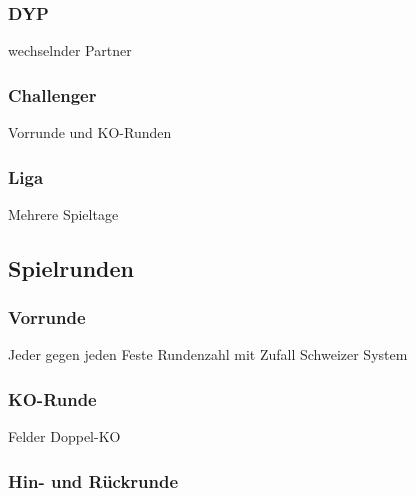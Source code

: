 \subsubsection{DYP}
\label{turniere:vorbereitung:modus:dyp}

wechselnder Partner

\subsubsection{Challenger}
\label{turniere:vorbereitung:modus:challenger}

Vorrunde und KO-Runden


\subsubsection{Liga}
\label{turniere:vorbereitung:modus:liga}

Mehrere Spieltage

\subsection{Spielrunden}
\label{turniere:vorbereitung:spielrunden}

\subsubsection{Vorrunde}
\label{turniere:vorbereitung:spielrunden:vorrunde}

Jeder gegen jeden
Feste Rundenzahl mit Zufall
Schweizer System

\subsubsection{KO-Runde}
\label{turniere:vorbereitung:spielrunden:ko}

Felder
Doppel-KO

\subsubsection{Hin- und Rückrunde}
\label{turniere:vorbereitung:spielrunden:hinrueck}

